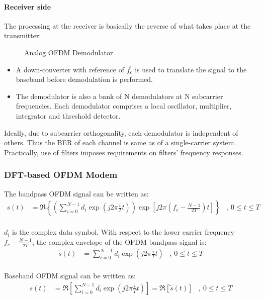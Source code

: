 \paragraph{Receiver side}
The processing at the receiver is basically the reverse of what takes place at the transmitter\cite{ofdm_intro}:
\begin{figure}[h!]
	\centerline{\resizebox{16cm}{!}{}}
	\caption{Analog \gls{OFDM} Demodulator}
	\label{fig:anal_demod}
\end{figure}
\begin{itemize}
	\item A down-converter with reference of $f_c^\prime$ is used to translate the signal to the baseband before demodulation is performed.
	\item The demodulator is also a bank of N demodulators at N subcarrier frequencies. Each demodulator comprises a local oscillator, multiplier, integrator and threshold detector.
\end{itemize}
Ideally, due to subcarrier \gls{orthogonal}ity, each demodulator is independent of others. Thus the \gls{BER} of each channel is same as of a single-carrier system. Practically, use of filters imposes requirements on filters' frequency responses.

\subsubsection{\gls{DFT}-based \gls{OFDM} Modem}
The bandpass OFDM signal can be written as:
\begin{align*}
s(t) &= \Re\left\{ \left( \sum_{i=0}^{N-1}d_i\exp(j2\pi \frac{i}{T}t)\right)\exp\left[ j2\pi\left( f_c-\frac{N-1}{2T}\right)t\right]\right\}&,\ 0\leq t\leq T\\
\end{align*}

$d_i$ is the complex data symbol. With respect to the lower carrier frequency $f_c - \frac{N-1}{2T}$, the complex envelope of the \gls{OFDM} bandpass signal is:
\begin{align*}
\tilde{s}(t) &= \sum_{i=0}^{N-1}d_i\exp(j2\pi\frac{i}{T}t)&,\ 0\leq t\leq T\\
\end{align*}

Baseband \gls{OFDM} signal can be written as:
\begin{align*}
s(t) &= \Re\left[ \sum_{i=0}^{N-1}d_i\exp(j2\pi\frac{i}{T}t)\right] = \Re\left[ \tilde{s}(t)\right]&,\ 0\leq t\leq T\\
\end{align*}


